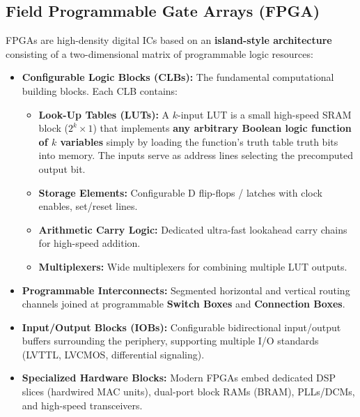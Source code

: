 \documentclass[12pt,a4paper]{article}
\begin{document}
\subsection{Field Programmable Gate Arrays (FPGA)}
FPGAs are high-density digital ICs based on an \textbf{island-style architecture} consisting of a two-dimensional matrix of programmable logic resources:
\begin{itemize}[leftmargin=*, itemsep=4pt]
  \item \textbf{Configurable Logic Blocks (CLBs):} The fundamental computational building blocks. Each CLB contains:
    \begin{itemize}
      \item \textbf{Look-Up Tables (LUTs):} A $k$-input LUT is a small high-speed SRAM block ($2^k \times 1$) that implements \textbf{any arbitrary Boolean logic function of $k$ variables} simply by loading the function's truth table truth bits into memory. The inputs serve as address lines selecting the precomputed output bit.
      \item \textbf{Storage Elements:} Configurable D flip-flops / latches with clock enables, set/reset lines.
      \item \textbf{Arithmetic Carry Logic:} Dedicated ultra-fast lookahead carry chains for high-speed addition.
      \item \textbf{Multiplexers:} Wide multiplexers for combining multiple LUT outputs.
    \end{itemize}
  \item \textbf{Programmable Interconnects:} Segmented horizontal and vertical routing channels joined at programmable \textbf{Switch Boxes} and \textbf{Connection Boxes}.
  \item \textbf{Input/Output Blocks (IOBs):} Configurable bidirectional input/output buffers surrounding the periphery, supporting multiple I/O standards (LVTTL, LVCMOS, differential signaling).
  \item \textbf{Specialized Hardware Blocks:} Modern FPGAs embed dedicated DSP slices (hardwired MAC units), dual-port block RAMs (BRAM), PLLs/DCMs, and high-speed transceivers.
\end{itemize}
\end{document}
